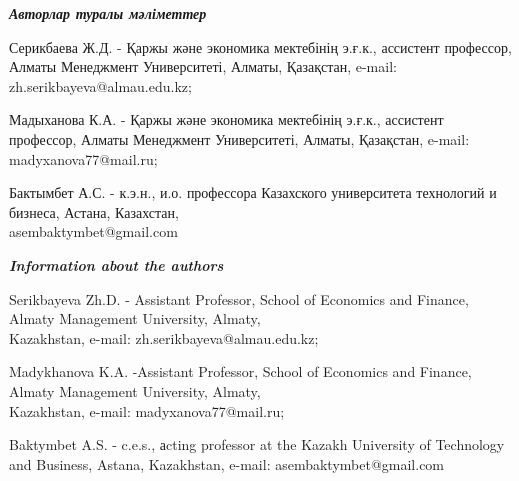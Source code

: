 \begin{authorinfo}
\emph{{\bfseries Авторлар туралы мәліметтер}}

Серикбаева Ж.Д. - Қаржы және экономика мектебінің э.ғ.к., ассистент
профессор, Алматы Менеджмент Университеті, Алматы, Қазақстан, e-mail:
zh.serikbayeva@almau.edu.kz;

Мадыханова К.А. - Қаржы және экономика мектебінің э.ғ.к., ассистент
профессор, Алматы Менеджмент Университеті, Алматы, Қазақстан, e-mail:
madyxanova77@mail.ru;

Бактымбет А.С. - к.э.н., и.о. профессора Казахского университета
технологий и бизнеса, Астана, Казахстан,\\
asembaktymbet@gmail.com

\emph{{\bfseries Information about the authors}}

Serikbayeva Zh.D. - Assistant Professor, School of Economics and
Finance, Almaty Management University, Almaty, \\Kazakhstan, e-mail:
zh.serikbayeva@almau.edu.kz;

Madykhanova K.A. -Assistant Professor, School of Economics and Finance,
Almaty Management University, Almaty, \\Kazakhstan, e-mail:
madyxanova77@mail.ru;

Baktymbet A.S. - c.e.s., аcting professor at the Kazakh University of
Technology and Business, Astana, Kazakhstan, e-mail:
asembaktymbet@gmail.com
\end{authorinfo}
